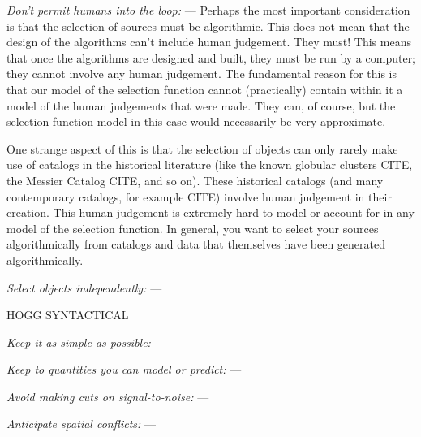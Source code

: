 \documentclass[modern]{aastex62}
\renewcommand{\paragraph}[1]{\medskip\noindent\textit{#1} ---}
\begin{document}
\paragraph{Don't permit humans into the loop:}
Perhaps the most important consideration is that the selection of sources
must be algorithmic.
This does not mean that the design of the algorithms can't include
human judgement. They must!
This means that once the algorithms are designed and built, they must
be run by a computer; they cannot involve any human judgement.
The fundamental reason for this is that our model of the selection
function cannot (practically) contain within it a model of the human
judgements that were made.
They can, of course, but the selection function model in this case
would necessarily be very approximate.

One strange aspect of this is that the selection of objects can only
rarely make use of catalogs in the historical literature (like the known
globular clusters CITE, the Messier Catalog CITE, and so on).
These historical catalogs (and many contemporary catalogs, for example CITE)
involve human judgement in their creation.
This human judgement is extremely hard to model or account for in any
model of the selection function.
In general, you want to select your sources algorithmically from
catalogs and data that themselves have been generated algorithmically.

\paragraph{Select objects independently:}

HOGG SYNTACTICAL

\paragraph{Keep it as simple as possible:}

\paragraph{Keep to quantities you can model or predict:}

\paragraph{Avoid making cuts on signal-to-noise:}

\paragraph{Anticipate spatial conflicts:}
\end{document}
